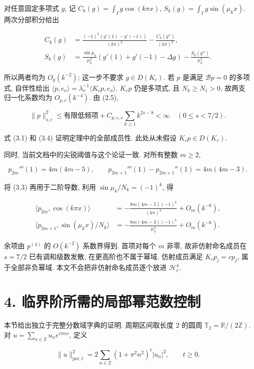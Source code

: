 \documentclass[UTF8,fontset=fandol,11pt,a4paper]{ctexart}
\begin{document}
对任意固定多项式 \(g\), 记
\(C_k(g)=\int_Ig\cos(k\pi x)\), \(S_k(g)=\int_Ig\sin(\mu_kx)\).
两次分部积分给出


\[
 \begin{split}
 C_k(g)&=\frac{(-1)^k(g'(1)-g'(-1))}{(k\pi)^2}
                 -\frac{C_k(g'')}{(k\pi)^2},\\
 S_k(g)&=\frac{\sin\mu_k}{\mu_k^2}
           (g'(1)+g'(-1)-\Delta g)
                 -\frac{S_k(g'')}{\mu_k^2}.
 \end{split}
 \tag{3.3}
\]


所以两者均为 \(O_g(k^{-2})\); 这一步不要求 \(g\in D(K_c)\). 若 \(p\) 是满足 \(\mathcal Bp=0\) 的多项式, 自伴性给出
\(\langle p,e_\nu\rangle=\lambda_\nu^{-1}\langle K_cp,e_\nu\rangle\).
\(K_cp\) 仍是多项式, 且 \(N_k\ge N_1>0\), 故两支归一化系数均为 \(O_{p,c}(k^{-4})\). 由 (2.5),


\[
 \|p\|_{s,c}^2
 \le \text{有限低频项}+C_{p,c,s}\sum_{k\ge1}k^{2s-8}<\infty
 \quad(0\le s<7/2).
 \tag{3.4}
\]


式 (3.1) 和 (3.4) 证明定理中的全部成员性. 此处从未假设 \(K_cp\in D(K_c)\).


同时, 当前文档中的尖锐阈值与这个论证一致. 对所有整数 \(m\ge2\),


\[
 p_{2m}'''(1)=4m(4m-5),\qquad
 p_{2m+1}'''(1)-p_{2m+1}''(1)=4m(4m-3).
 \tag{3.5}
\]


将 (3.3) 再用于二阶导数, 利用 \(\sin\mu_k/N_k=(-1)^k\), 得


\[
 \begin{split}
 \langle p_{2m},\cos(k\pi x)\rangle
 &=-\frac{8m(4m-5)(-1)^k}{(k\pi)^4}+O_m(k^{-6}),\\
 \langle p_{2m+1},\sin(\mu_kx)/N_k\rangle
 &=-\frac{8m(4m-3)(-1)^k}{\mu_k^4}+O_m(k^{-6}).
 \end{split}
 \tag{3.6}
\]


余项由 \(p^{(4)}\) 的 \(O(k^{-2})\) 系数界得到. 首项对每个 \(m\) 非零, 故非仿射命名成员在 \(s=7/2\) 已有调和级数发散, 在更高阶也不属于幂域. 仿射成员满足 \(K_cp_j=cp_j\), 属于全部非负幂域. 本文不会把非仿射命名成员逐个放进 \(\mathcal H_c^4\).


\section*{4. 临界阶所需的局部幂范数控制}

本节给出独立于完整分数域字典的证明. 周期区间取长度 2 的圆周 \(\mathbb T_2=\mathbb R/(2\mathbb Z)\). 对 \(u=\sum_{n\in\mathbb Z}u_n e^{i\pi nx}\), 定义


\[
 \|u\|_{\mathrm{per},t}^2
 =2\sum_{n\in\mathbb Z}(1+\pi^2n^2)^t|u_n|^2,\qquad t\ge0.
 \tag{4.1}
\]
\end{document}
